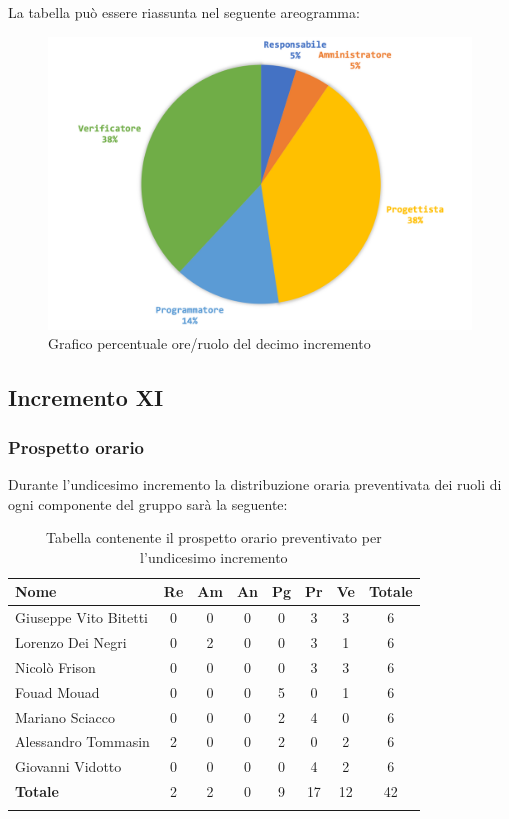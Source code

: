 		La tabella può essere riassunta nel seguente areogramma:
		\begin{figure}[H]
			\centering
			\includegraphics[width=0.8\linewidth]{./images/preventivo/incremento10-2.png}
			\caption{Grafico percentuale ore/ruolo del decimo incremento}
			\label{fig:grafico costi ruolo incremento X}
		\end{figure}
		
		
		
	\subsection{Incremento XI}
		\subsubsection{Prospetto orario}
		Durante l'undicesimo incremento la distribuzione oraria preventivata dei ruoli di ogni componente del gruppo sarà la seguente:
		
		\begin{longtable}{|l|c|c|c|c|c|c|c|}
			\hline
			\rowcolor{lighter-grayer}
			\textbf{Nome} & \textbf{Re} & \textbf{Am} & \textbf{An} & \textbf{Pg}  & \textbf{Pr}   & \textbf{Ve} & \textbf{Totale} \\
			\hline
			\endfirsthead
			
			\hline
			Giuseppe Vito Bitetti 		 & 0 & 0 & 0 & 0 & 3 & 3 & 6\\
			\hline
			\hline
			Lorenzo Dei Negri			 & 0 & 2 & 0 & 0 & 3 & 1 & 6\\
			\hline
			\hline
			Nicolò Frison				      & 0 & 0 & 0 & 0 & 3 & 3 & 6\\
			\hline
			\hline
			Fouad Mouad 				   & 0 & 0 & 0 & 5 & 0 & 1 & 6\\
			\hline
			\hline
			Mariano Sciacco 			 & 0 & 0 & 0 & 2 & 4 & 0 & 6\\
			\hline
			\hline
			Alessandro Tommasin    & 2 & 0 & 0 & 2 & 0 & 2 & 6\\
			\hline
			\hline
			Giovanni Vidotto 			  & 0 & 0 & 0 & 0 & 4 & 2 & 6\\
			\hline 
			\textbf{Totale}			 		& 2 & 2 & 0 & 9 & 17 & 12 & 42\\
			\hline
			\caption{Tabella contenente il prospetto orario preventivato per l'undicesimo incremento}
		\end{longtable}
		\pagebreak
		
